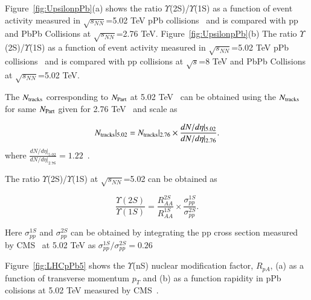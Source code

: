 Figure~\ref{fig:UpsilonpPb}(a) shows
the ratio $\Upsilon$(2S)/$\Upsilon$(1S) as a function of event activity measured in 
$\sqrt{s_{NN}}$=5.02 TeV pPb collisions~\cite{CMS:2013jsu} and is compared with pp
and PbPb Collisions at $\sqrt{s_{NN}}$=2.76 TeV.
Figure~\ref{fig:UpsilonpPb}(b) The ratio $\Upsilon$(2S)/$\Upsilon$(1S) as a function of event activity measured in 
$\sqrt{s_{NN}}$=5.02 TeV pPb collisions~\cite{CMS:2013jsu} and is compared with pp
collisions at $\sqrt{s}$=8 TeV \cite{CMS:2020fae} and PbPb Collisions at $\sqrt{s_{NN}}$=5.02 TeV.


The $N_{\rm tracks}$ corresponding to $N_{\rm Part}$ at 5.02 TeV~\cite{CMS:2018zza}
can be obtained using the $N_{\rm tracks}$ for same $N_{\rm Part}$ given
for 2.76 TeV~\cite{CMS:2013jsu} and scale as 


\begin{equation}
N_{\rm tracks}|_{5.02} =  N_{\rm tracks}|_{2.76} \times \frac{dN/d\eta |_{5.02}} {dN/d\eta|_{2.76}}.
\end{equation}
where $\frac{dN/d\eta |_{5.02}} {dN/d\eta|_{2.76}}=1.22$~\cite{eta}.

The ratio $\Upsilon$(2S)/$\Upsilon$(1S) at $\sqrt{s_{NN}}$=5.02 can be obtained as 

\begin{equation}
\frac{\Upsilon(2S)}{\Upsilon(1S)} = \frac{R_{AA}^{2S}}{R_{AA}^{1S}} \times \frac{\sigma_{pp}^{1S}}{\sigma_{pp}^{2S}}.
\end{equation}

Here $\sigma_{pp}^{1S}$ and $\sigma_{pp}^{2S}$ can be obtained by integrating the pp cross section
measured by CMS~\cite{CMS:2013jsu} at 5.02 TeV as $\sigma_{pp}^{1S}/\sigma_{pp}^{2S}=0.26$




Figure~\ref{fig:LHCpPb5} shows the $\Upsilon$(nS) nuclear modification factor, $R_{pA}$,
      (a) as a function of transverse momentum $p_{T}$
    and (b) as a function rapidity in pPb colisions at 5.02 TeV measured by CMS~\cite{CMS:2022wfi}.



